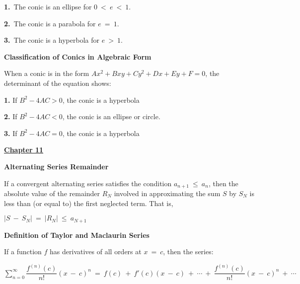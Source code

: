 \documentclass{article}
\begin{document}
\begin{large}
\hspace{0.2in} \textbf{1.}\ The conic is an ellipse for $0\ <\ e\ <\ 1$.

\hspace{0.2in} \textbf{2.}\ The conic is a parabola for $e\ =\ 1$.

\hspace{0.2in} \textbf{3.}\ The conic is a hyperbola for $e\ >\ 1$.

\textbf{Classification of Conics in Algebraic Form}

When a conic is in the form $Ax^2+Bxy+Cy^2+Dx+Ey+F=0$, the determinant of the equation shows:
{\large

\textbf{1.} If $B^2-4AC>0$, the conic is a hyperbola

\textbf{2.} If $B^2-4AC<0$, the conic is an ellipse or circle.

\textbf{3.} If $B^2-4AC=0$, the conic is a hyperbola} 

\vspace{0.25in}

\newpage



\newpage

\underline{\textbf{\huge Chapter 11 \phantom{ } \phantom{ } \phantom{ } \phantom{ }}}

\vspace{0.2in}

\textbf{Alternating Series Remainder}

\hspace{0.1in} If a convergent alternating series satisfies the condition $a_{n+1}\ \leq\ a_{n}$, then the absolute value of the remainder $R_{N}$ involved in approximating the sum $S$ by $S_{N}$ is less than (or equal to) the first neglected term.  That is,

\hspace{2.5in} $|S\ -\ S_{N}|\ =\ |R_{N}|\ \leq\ a_{N+1}$

\textbf{Definition of Taylor and Maclaurin Series}

\hspace{0.1in} If a function $f$ has derivatives of all orders at $x\ =\ c$, then the series:

\hspace{0.2in} $\displaystyle\sum^{\infty}_{n=0}\dfrac{f^{(n)}(c)}{n!}(x\ -\ c)^{n}\ =\ f(c)\ +\ f'(c)(x\ -\ c)\ +\ \cdots\ +\ \dfrac{f^{(n)}(c)}{n!}(x\ -\ c)^{n}\ +\ \cdots$


\end{large}
\end{document}
